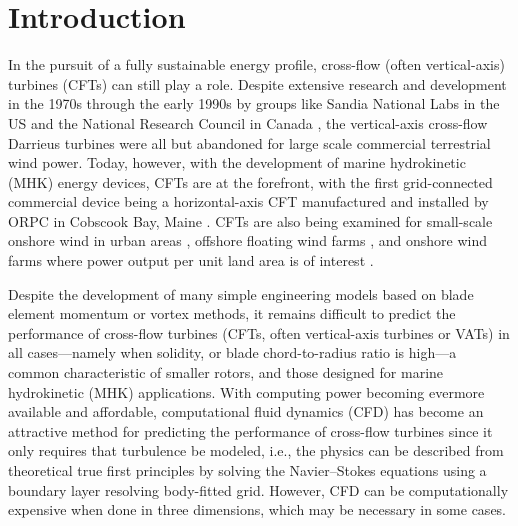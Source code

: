 \documentclass[aip,graphicx]{revtex4-1}
\begin{document}
\pacs{}%

\maketitle %
\listoftodos

\section{Introduction}

In the pursuit of a fully sustainable energy profile, cross-flow (often
vertical-axis) turbines (CFTs) can still play a role. Despite extensive research
and development in the 1970s through the early 1990s by groups like Sandia
National Labs in the US \cite{Sutherland2012} and the National Research Council
in Canada \cite{Para2002}, the vertical-axis cross-flow Darrieus turbines were
all but abandoned for large scale commercial terrestrial wind power. Today,
however, with the development of marine hydrokinetic (MHK) energy devices, CFTs
are at the forefront, with the first grid-connected commercial device being a
horizontal-axis CFT manufactured and installed by ORPC in Cobscook Bay, Maine
\cite{ORPC2012}. CFTs are also being examined for small-scale onshore wind in
urban areas \cite{Lott2015}, offshore floating wind farms \cite{Paulsen2011,
    Sandia2012}, and onshore wind farms where power output per unit land area is of
interest \cite{Dabiri2011}.

Despite the development of many simple engineering models based on blade element
momentum or vortex methods, it remains difficult to predict the performance of
cross-flow turbines (CFTs, often vertical-axis turbines or VATs) in all
cases---namely when solidity, or blade chord-to-radius ratio is high---a common
characteristic of smaller rotors, and those designed for marine hydrokinetic
(MHK) applications. With computing power becoming evermore available and
affordable, computational fluid dynamics (CFD) has become an attractive method
for predicting the performance of cross-flow turbines since it only requires
that turbulence be modeled, i.e., the physics can be described from theoretical
true first principles by solving the Navier--Stokes equations using a boundary
layer resolving body-fitted grid. However, CFD can be computationally expensive
when done in three dimensions, which may be necessary in some cases.
\end{document}
